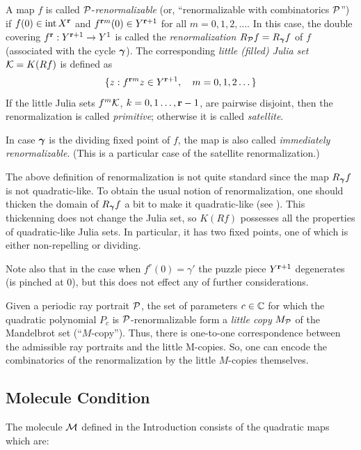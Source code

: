 \begin{definition} 
A map $f$ is called ${\mathcal P}$-{\it renormalizable} 
(or, ``renormalizable with combinatorics ${\mathcal P}$'')
if $f(0)\in \operatorname{int} X^{\mathbf{r}}$ and $f^{{\mathbf{r}} m}(0)\in  Y^{{\mathbf{r}}+1}$  
for all $m=0,1,2,\dots$. 
In this case, the double covering $f^{\mathbf{r}} : Y^{{\mathbf{r}}+1}\rightarrow Y^1$ is called
the {\it renormalization} $R_{\mathcal P} f = R_{\mbox{\scriptsize\boldmath$\gamma$} } f$ of $f$ (associated with the cycle ${\mbox{\boldmath$\gamma$} }$).
The corresponding {\it  little (filled) Julia set} ${\mathcal K} = K(R f)$ 
is defined as 
$$
        \{ z: f^{{\mathbf{r}} m}z\in Y^{{\mathbf{r}} + 1} ,\quad  m=0,1,2\dots\}
$$
If the little Julia sets $f^m {\mathcal K}$, $k=0,1\dots, {\mathbf{r}}-1$, 
are pairwise disjoint, then the renormalization is called {\it primitive};
otherwise it is called {\it satellite}. 

In case ${\mbox{\boldmath$\gamma$} }$ is the dividing fixed point of $f$,
the map  is also called {\it immediately renormalizable}.
(This is a particular case of the satellite renormalization.)
\end{definition}



\begin{rem} The above  definition of renormalization is not quite standard since the map 
$R_{\mbox{\scriptsize\boldmath$\gamma$} } f$ is not quadratic-like. To obtain the usual notion of renormalization, 
one should thicken the domain of $R_{\mbox{\scriptsize\boldmath$\gamma$} } f$  a bit to make it quadratic-like (see \cite{D,M}). 
This thickenning does not change the Julia set, so $K(Rf)$ possesses all the properties of 
quadratic-like Julia sets. In particular, it has two fixed points, one of which is either
non-repelling or dividing.

Note also that in the case when $f^r(0)=\gamma'$ the puzzle piece
$Y^{{\mathbf{r}}+1}$ degenerates (is pinched at $0$), but this does not effect any of 
further considerations. 
\end{rem}

Given a periodic ray portrait ${\mathcal P}$, 
the set of parameters $c\in {\mathbb C}$ for which the quadratic polynomial $P_c$ is ${\mathcal P}$-renormalizable form a 
{\it little copy} $M_{\mathcal P}$ of the Mandelbrot set (``$M$-copy''). Thus, there is one-to-one correspondence
between the admissible ray portraits and the little M-copies.
So, one can encode the combinatorics of the renormalization by the little $M$-copies themselves. 

\subsection{Molecule Condition}

The  molecule ${\mathcal M}$ defined in the Introduction consists of the quadratic maps which are:

